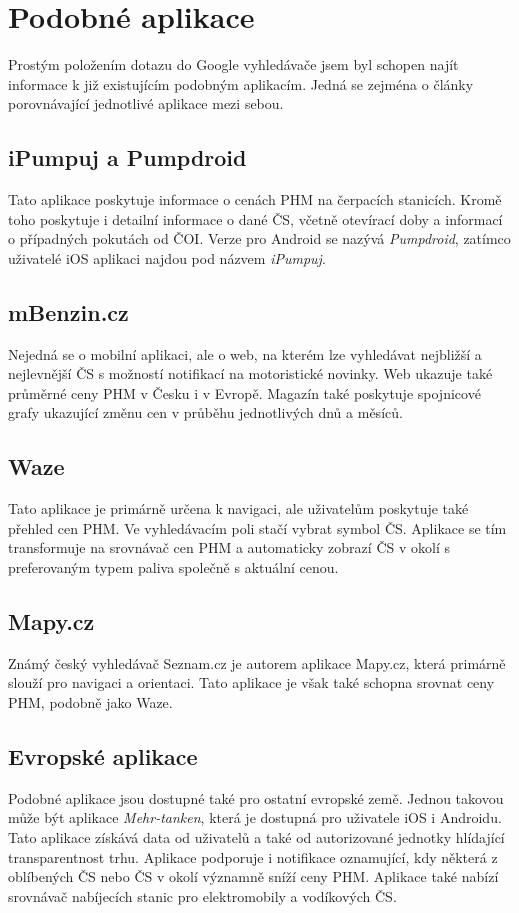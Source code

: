 \chapter{Podobné aplikace}
Prostým položením dotazu do Google vyhledávače jsem byl schopen najít
informace k již existujícím podobným aplikacím. Jedná se zejména o články
porovnávající jednotlivé aplikace mezi sebou.

\section{iPumpuj a Pumpdroid}
Tato aplikace poskytuje informace o cenách PHM na čerpacích stanicích.
Kromě toho poskytuje i detailní informace o dané ČS, včetně otevírací
doby a informací o případných pokutách od ČOI. Verze pro Android
se nazývá \emph{Pumpdroid}, zatímco uživatelé iOS aplikaci najdou
pod názvem \emph{iPumpuj}.
\cite{Vrablova2022}
\cite{Sarikova2021}

\section{mBenzin.cz}
Nejedná se o mobilní aplikaci, ale o web, na kterém lze vyhledávat
nejbližší a nejlevnější ČS s možností notifikací na motoristické
novinky. Web ukazuje také průměrné ceny PHM v Česku i v Evropě.
Magazín také poskytuje spojnicové grafy ukazující změnu cen
v průběhu jednotlivých dnů a měsíců.
\cite{Vrablova2022}

\section{Waze}
Tato aplikace je primárně určena k navigaci, ale uživatelům poskytuje
také přehled cen PHM. Ve vyhledávacím poli stačí vybrat symbol ČS.
Aplikace se tím transformuje na srovnávač cen PHM a automaticky zobrazí
ČS v okolí s preferovaným typem paliva společně s aktuální cenou.
\cite{Vrablova2022}

\section{Mapy.cz}
Známý český vyhledávač Seznam.cz je autorem aplikace Mapy.cz, která
primárně slouží pro navigaci a orientaci. Tato aplikace je však také
schopna srovnat ceny PHM, podobně jako Waze.
\cite{Vrablova2023}

\section{Evropské aplikace}
Podobné aplikace jsou dostupné také pro ostatní evropské země. Jednou
takovou může být aplikace \emph{Mehr-tanken}, která je dostupná
pro uživatele iOS i Androidu. Tato aplikace získává data od uživatelů
a také od autorizované jednotky hlídající transparentnost trhu.
Aplikace podporuje i notifikace oznamující, kdy některá z oblíbených
ČS nebo ČS v okolí významně sníží ceny PHM. Aplikace také nabízí
srovnávač nabíjecích stanic pro elektromobily a vodíkových ČS.
\cite{r6fadX3YRnFIir68}

